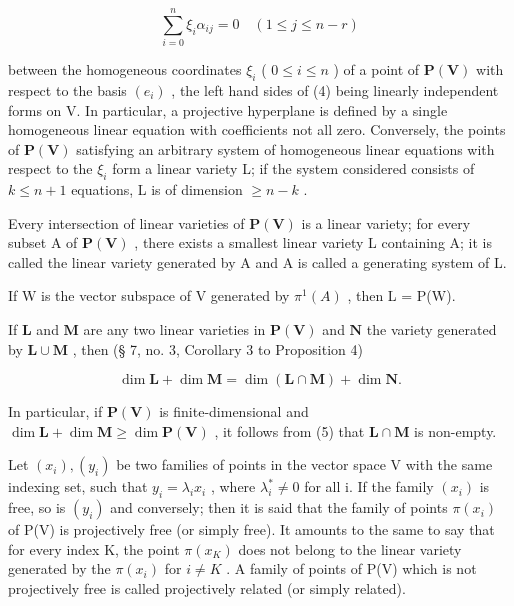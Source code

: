 \[
\sum_ {i = 0} ^ {n} \xi_ {i} \alpha_ {i j} = 0 \quad (1 \leqslant j \leqslant n - r)\tag{4}
\]

between the homogeneous coordinates \(\xi_{i}\) ( \(0 \leqslant i \leqslant n\) ) of a point of \(\mathbf{P}(\mathbf{V})\) with respect to the basis \((e_{i})\) , the left hand sides of (4) being linearly independent forms on V. In particular, a projective hyperplane is defined by a single homogeneous linear equation with coefficients not all zero. Conversely, the points of \(\mathbf{P}(\mathbf{V})\) satisfying an arbitrary system of homogeneous linear equations with respect to the \(\xi_{i}\) form a linear variety L; if the system considered consists of \(k \leqslant n + 1\) equations, L is of dimension \(\geqslant n - k\) .

Every intersection of linear varieties of \(\mathbf{P}(\mathbf{V})\) is a linear variety; for every subset A of \(\mathbf{P}(\mathbf{V})\) , there exists a smallest linear variety L containing A; it is called the linear variety generated by A and A is called a generating system of L.

If W is the vector subspace of V generated by \(\pi^{1}(A)\) , then L = P(W).

If \(\mathbf{L}\) and \(\mathbf{M}\) are any two linear varieties in \(\mathbf{P}(\mathbf{V})\) and \(\mathbf{N}\) the variety generated by \(\mathbf{L} \cup \mathbf{M}\) , then (§ 7, no. 3, Corollary 3 to Proposition 4)

\[
\dim \mathbf {L} + \dim \mathbf {M} = \dim (\mathbf {L} \cap \mathbf {M}) + \dim \mathbf {N}.\tag{5}
\]

In particular, if \(\mathbf{P}(\mathbf{V})\) is finite-dimensional and \(\dim \mathbf{L} + \dim \mathbf{M} \geqslant \dim \mathbf{P}(\mathbf{V})\) , it follows from (5) that \(\mathbf{L} \cap \mathbf{M}\) is non-empty.

Let \((x_{i}), (y_{i})\) be two families of points in the vector space V with the same indexing set, such that \(y_{i} = \lambda_{i}x_{i}\) , where \(\lambda_{i}^{*} \neq 0\) for all i. If the family \((x_{i})\) is free, so is \((y_{i})\) and conversely; then it is said that the family of points \(\pi(x_{i})\) of P(V) is projectively free (or simply free). It amounts to the same to say that for every index K, the point \(\pi(x_{K})\) does not belong to the linear variety generated by the \(\pi(x_{i})\) for \(i \neq K\) . A family of points of P(V) which is not projectively free is called projectively related (or simply related).

